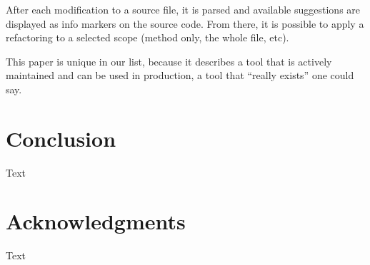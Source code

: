 \documentclass[conference,compsoc,a4paper]{IEEEtran}
\begin{document}
	After each modification to a source file, it is parsed and available suggestions are displayed as info markers on the 
	source code. From there, it is possible to apply a refactoring to a selected scope (method only, the whole file, etc).
	
	This paper is unique in our list, because it describes a tool that is actively maintained and can be used in 
	production, a tool that \enquote{really exists} one could say.
	
	
	\section{Conclusion}
	
	Text
	
	
	\section*{Acknowledgments}
	
	Text
	
	
	
	
	
	
\end{document}
